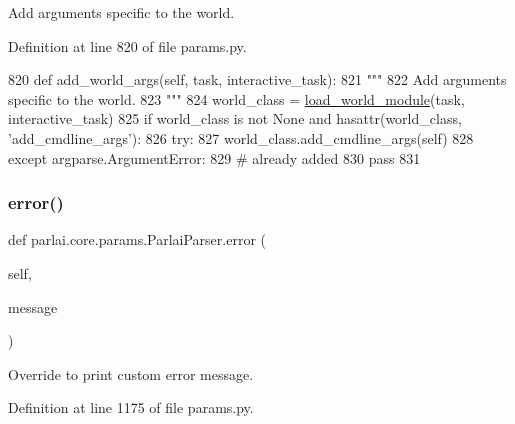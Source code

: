 \begin{DoxyVerb}Add arguments specific to the world.
\end{DoxyVerb}
 

Definition at line 820 of file params.\+py.


\begin{DoxyCode}
820     \textcolor{keyword}{def }add\_world\_args(self, task, interactive\_task):
821         \textcolor{stringliteral}{"""}
822 \textcolor{stringliteral}{        Add arguments specific to the world.}
823 \textcolor{stringliteral}{        """}
824         world\_class = \hyperlink{namespaceparlai_1_1core_1_1loader_adb9c272f49c31c45dcbc61d8e8c6316d}{load\_world\_module}(task, interactive\_task)
825         \textcolor{keywordflow}{if} world\_class \textcolor{keywordflow}{is} \textcolor{keywordflow}{not} \textcolor{keywordtype}{None} \textcolor{keywordflow}{and} hasattr(world\_class, \textcolor{stringliteral}{'add\_cmdline\_args'}):
826             \textcolor{keywordflow}{try}:
827                 world\_class.add\_cmdline\_args(self)
828             \textcolor{keywordflow}{except} argparse.ArgumentError:
829                 \textcolor{comment}{# already added}
830                 \textcolor{keywordflow}{pass}
831 
\end{DoxyCode}
\mbox{\label{classparlai_1_1core_1_1params_1_1ParlaiParser_a8d0cb15ecc35f82c94b5a19c2a6a9d12}} 
\subsubsection{\texorpdfstring{error()}{error()}}
{\footnotesize\ttfamily def parlai.\+core.\+params.\+Parlai\+Parser.\+error (\begin{DoxyParamCaption}\item[{}]{self,  }\item[{}]{message }\end{DoxyParamCaption})}

\begin{DoxyVerb}Override to print custom error message.
\end{DoxyVerb}
 

Definition at line 1175 of file params.\+py.


